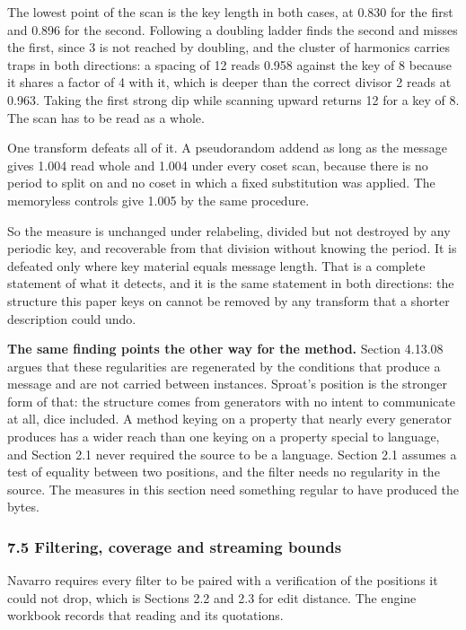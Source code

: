 The lowest point of the scan is the key length in both cases, at 0.830 for the first and 0.896 for the second. Following a doubling ladder finds the second and misses the first, since 3 is not reached by doubling, and the cluster of harmonics carries traps in both directions: a spacing of 12 reads 0.958 against the key of 8 because it shares a factor of 4 with it, which is deeper than the correct divisor 2 reads at 0.963. Taking the first strong dip while scanning upward returns 12 for a key of 8. The scan has to be read as a whole.

One transform defeats all of it. A pseudorandom addend as long as the message gives 1.004 read whole and 1.004 under every coset scan, because there is no period to split on and no coset in which a fixed substitution was applied. The memoryless controls give 1.005 by the same procedure.

So the measure is unchanged under relabeling, divided but not destroyed by any periodic key, and recoverable from that division without knowing the period. It is defeated only where key material equals message length. That is a complete statement of what it detects, and it is the same statement in both directions: the structure this paper keys on cannot be removed by any transform that a shorter description could undo.

\noindent\textbf{The same finding points the other way for the method.} Section 4.13.08 argues that these regularities are regenerated by the conditions that produce a message and are not carried between instances. Sproat's position is the stronger form of that: the structure comes from generators with no intent to communicate at all, dice included. A method keying on a property that nearly every generator produces has a wider reach than one keying on a property special to language, and Section 2.1 never required the source to be a language. Section 2.1 assumes a test of equality between two positions, and the filter needs no regularity in the source. The measures in this section need something regular to have produced the bytes.

\subsubsection{7.5 Filtering, coverage and streaming bounds}

Navarro \cite{src:Navarro} requires every filter to be paired with a verification of the positions it could not drop, which is Sections 2.2 and 2.3 for edit distance. The engine workbook records that reading and its quotations.

